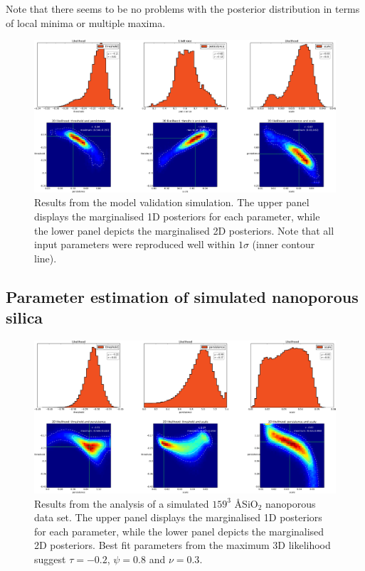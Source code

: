 \documentclass[aps,pre,twocolumn,letterpaper,floatfix,showpacs]{revtex4}
\begin{document}
Note that there seems to be no problems with the posterior distribution in terms of local minima or multiple maxima. 

\begin{figure}
\includegraphics[width=.99\textwidth]{mock_data_results_pts.png}
\caption{Results from the model validation simulation. The upper panel displays the marginalised 1D posteriors for each parameter, while the lower panel depicts the marginalised 2D posteriors. Note that all input parameters were reproduced well within $1\sigma$ (inner contour line).}
\label{fig:mockdataresults_pts}
\end{figure}

\subsection{Parameter estimation of simulated nanoporous silica}
\begin{figure}
\includegraphics[width=.99\textwidth]{results_porous_full.png}
\caption{Results from the analysis of a simulated $159^3$ \AA SiO$_2$ nanoporous data set. The upper panel displays the marginalised 1D posteriors for each parameter, while the lower panel depicts the marginalised 2D posteriors. Best fit parameters from the maximum 3D likelihood suggest $\tau=-0.2$, $\psi=0.8$ and $\nu=0.3$.}
\label{fig:porous_results1}
\end{figure}
\end{document}
